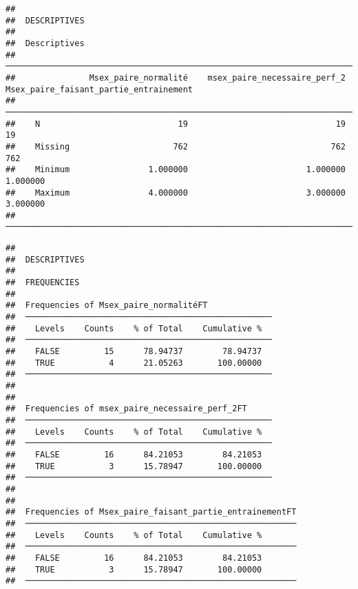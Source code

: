 \documentclass[
]{article}
\begin{document}
\begin{verbatim}
## 
##  DESCRIPTIVES
## 
##  Descriptives                                                                                                  
##  ───────────────────────────────────────────────────────────────────────────────────────────────────────────── 
##               Msex_paire_normalité    msex_paire_necessaire_perf_2    Msex_paire_faisant_partie_entrainement   
##  ───────────────────────────────────────────────────────────────────────────────────────────────────────────── 
##    N                            19                              19                                        19   
##    Missing                     762                             762                                       762   
##    Minimum                1.000000                        1.000000                                  1.000000   
##    Maximum                4.000000                        3.000000                                  3.000000   
##  ─────────────────────────────────────────────────────────────────────────────────────────────────────────────
\end{verbatim}

\begin{verbatim}
## 
##  DESCRIPTIVES
## 
##  FREQUENCIES
## 
##  Frequencies of Msex_paire_normalitéFT              
##  ────────────────────────────────────────────────── 
##    Levels    Counts    % of Total    Cumulative %   
##  ────────────────────────────────────────────────── 
##    FALSE         15      78.94737        78.94737   
##    TRUE           4      21.05263       100.00000   
##  ────────────────────────────────────────────────── 
## 
## 
##  Frequencies of msex_paire_necessaire_perf_2FT      
##  ────────────────────────────────────────────────── 
##    Levels    Counts    % of Total    Cumulative %   
##  ────────────────────────────────────────────────── 
##    FALSE         16      84.21053        84.21053   
##    TRUE           3      15.78947       100.00000   
##  ────────────────────────────────────────────────── 
## 
## 
##  Frequencies of Msex_paire_faisant_partie_entrainementFT 
##  ─────────────────────────────────────────────────────── 
##    Levels    Counts    % of Total    Cumulative %   
##  ─────────────────────────────────────────────────────── 
##    FALSE         16      84.21053        84.21053   
##    TRUE           3      15.78947       100.00000   
##  ───────────────────────────────────────────────────────
\end{verbatim}
\end{document}
